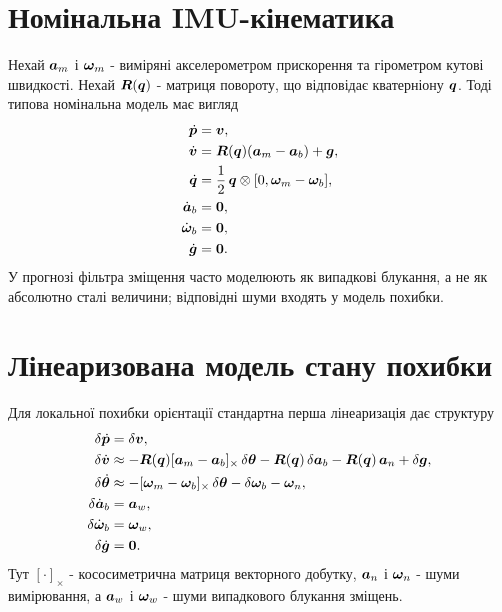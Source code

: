 \section{Номінальна IMU-кінематика}

Нехай $\bm{a}_m$ і $\bm{\omega}_m$ - виміряні акселерометром прискорення та гірометром кутові швидкості. Нехай $\bm{R}(\bm{q})$ - матриця повороту, що відповідає кватерніону $\bm{q}$. Тоді типова номінальна модель має вигляд
\begin{subequations}\label{eq:nominal_imu_dynamics}
\begin{align}
\dot{\bm{p}} &= \bm{v},\\
\dot{\bm{v}} &= \bm{R}(\bm{q})(\bm{a}_m-\bm{a}_b)+\bm{g},\\
\dot{\bm{q}} &= \frac{1}{2}\,\bm{q}\otimes[0,\bm{\omega}_m-\bm{\omega}_b],\\
\dot{\bm{a}}_b &= \bm{0},\\
\dot{\bm{\omega}}_b &= \bm{0},\\
\dot{\bm{g}} &= \bm{0}.
\end{align}
\end{subequations}
У прогнозі фільтра зміщення часто моделюють як випадкові блукання, а не як абсолютно сталі величини; відповідні шуми входять у модель похибки.

\section{Лінеаризована модель стану похибки}

Для локальної похибки орієнтації стандартна перша лінеаризація дає структуру
\begin{subequations}\label{eq:error_imu_dynamics}
\begin{align}
\delta\dot{\bm{p}} &= \delta\bm{v},\\
\delta\dot{\bm{v}} &\approx
-\bm{R}(\bm{q})[\bm{a}_m-\bm{a}_b]_{\times}\,\delta\bm{\theta}
-\bm{R}(\bm{q})\,\delta\bm{a}_b
-\bm{R}(\bm{q})\,\bm{a}_n
+\delta\bm{g},\\
\delta\dot{\bm{\theta}} &\approx
-[\bm{\omega}_m-\bm{\omega}_b]_{\times}\,\delta\bm{\theta}
-\delta\bm{\omega}_b
-\bm{\omega}_n,\\
\delta\dot{\bm{a}}_b &= \bm{a}_w,\\
\delta\dot{\bm{\omega}}_b &= \bm{\omega}_w,\\
\delta\dot{\bm{g}} &= \bm{0}.
\end{align}
\end{subequations}
Тут $[\cdot]_{\times}$ - кососиметрична матриця векторного добутку, $\bm{a}_n$ і $\bm{\omega}_n$ - шуми вимірювання, а $\bm{a}_w$ і $\bm{\omega}_w$ - шуми випадкового блукання зміщень.

